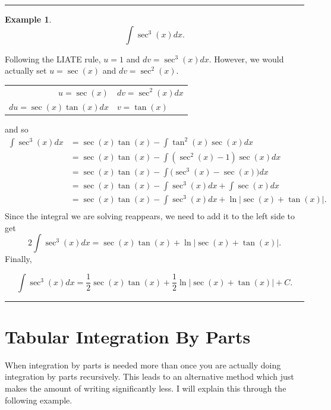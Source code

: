 \documentclass[reqno]{amsart}
\theoremstyle{definition}
\newtheorem{eg}{Example}
\numberwithin{equation}{section}
\begin{document}
\vspace{1pc}
\hrule
\vspace{1pc}
\begin{eg} \[ \int \sec^3(x) dx.\]

Following the LIATE rule, $u=1$ and $dv=\sec^3(x)dx$.  However, we would actually set $u=\sec(x)$ and $dv=\sec^2(x)$.

\begin{center}
  \begin{tabular}{ r||l}
    $u=\sec(x)$ & $dv=\sec^2(x) dx$ \\ 
    $du=\sec(x)\tan(x)dx$ & $v=\tan(x)$\\ 
  \end{tabular}
\end{center}

and so 
\begin{align*} \int \sec^3(x)dx &= \sec(x)\tan(x) - \int \tan^2(x)\sec(x)dx \\
&= \sec(x)\tan(x) - \int (\sec^2(x)-1)\sec(x)dx \\
&= \sec(x)\tan(x) - \int \big(\sec^3(x)-\sec(x)\big)dx \\
&= \sec(x)\tan(x) - \int \sec^3(x)dx+\int\sec(x)dx \\
&= \sec(x)\tan(x) - \int \sec^3(x)dx+\ln|\sec(x)+\tan(x)|. \\
\end{align*}
Since the integral we are solving reappears, we need to add it to the left side to get
\[ 2\int \sec^3(x)dx =\sec(x)\tan(x) +\ln|\sec(x)+\tan(x)|.  \]
Finally,

\[ \int \sec^3(x)dx =\frac{1}{2}\sec(x)\tan(x) +\frac{1}{2}\ln|\sec(x)+\tan(x)|  +C.\]

\end{eg}




\vspace{1pc}
\hrule
\vspace{1pc}

\section{Tabular Integration By Parts}

When integration by parts is needed more than once you are actually doing integration by parts recursively.  This leads to an alternative method which just makes the amount of writing significantly less.  I will explain this through the following example.
\end{document}
